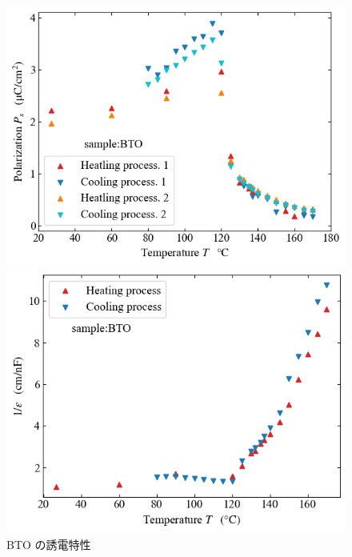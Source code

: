 \documentclass[9pt,dvipdfmx,a4paper]{jsarticle}
\begin{document}
\begin{figure}[hbt]
    \begin{minipage}[t]{0.48\columnwidth}
        \centering
        \includegraphics[width = \columnwidth]{discussion/BTO_Ps-T.png}
    \end{minipage}
    \hfill
    \begin{minipage}[t]{0.48\columnwidth}
        \centering
        \includegraphics[width = \columnwidth]{discussion/BTO_epsilon-T1.png}
    \end{minipage}
    \caption{BTO の誘電特性}
    \label{graph:BTO-histerisis}
\end{figure}
\end{document}

